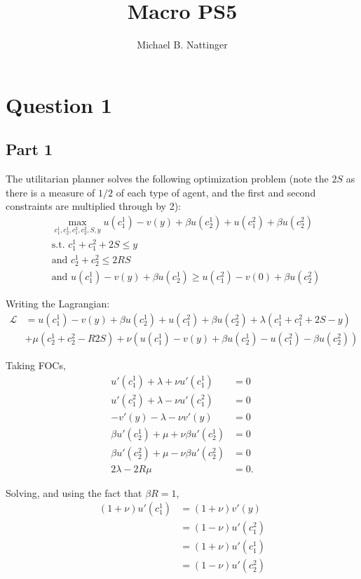 \documentclass[11pt]{article} %
\title{Macro PS5}
\author{Michael B. Nattinger}
\begin{document}
\maketitle
\section{Question 1}
\subsection{Part 1}
The utilitarian planner solves the following optimization problem (note the $2S$ as there is a measure of $1/2$ of each type of agent, and the first and second constraints are multiplied through by 2):
\begin{align*}
&\max_{c_1^1,c_2^1,c_1^2,c_2^2,S,y} u(c_1^1) - v(y) + \beta u(c_2^1)+u(c_1^2) + \beta u(c_2^2)\\
&\text{s.t. } c_1^1 + c_1^2 + 2S \leq y\\
&\text{and } c_2^1 + c_2^2 \leq 2RS \\ %
&\text{and } u(c_1^1) - v(y) + \beta u(c_2^1) \geq u(c_1^2) - v(0) + \beta u(c_2^2)
\end{align*}

Writing the Lagrangian:
\begin{align*}
\mathcal{L} &= u(c_1^1) - v(y) + \beta u(c_2^1) + u(c_1^2) + \beta u(c_2^2) +\lambda (c_1^1 + c_1^2 + 2S - y)  \\ &+ \mu (c_2^1 + c_2^2 - R2S) + \nu (u(c_1^1) - v(y) + \beta u(c_2^1) - u(c_1^2) - \beta u(c_2^2))  
\end{align*}

Taking FOCs,
\begin{align*}
u'(c_1^1) + \lambda + \nu u'(c_1^1)  &= 0\\
u'(c_1^2) + \lambda - \nu u'(c_1^2) &= 0 \\
-v'(y) - \lambda - \nu v'(y) &= 0\\
\beta u'(c_2^1) + \mu + \nu\beta u'(c_2^1) &= 0 \\
\beta u'(c_2^2) + \mu  - \nu\beta u'(c_2^2)&= 0 \\
2\lambda - 2R\mu &= 0.
\end{align*}

Solving, and using the fact that $\beta R = 1$,
\begin{align*}
(1+\nu)u'(c_1^1) &= (1+\nu)v'(y)\\
&= (1-\nu)u'(c_1^2)\\
&= (1+\nu)u'(c_1^1) \\
&= (1-\nu)u'(c_2^2)
\end{align*}
\end{document}
